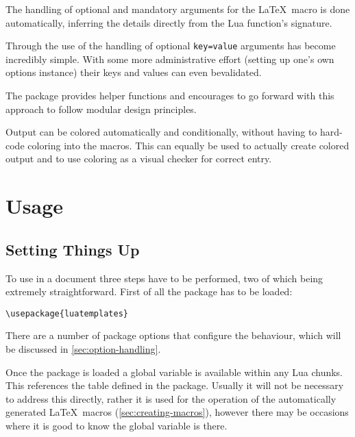 \documentclass{scrartcl}
\begin{document}
\begin{itemize*}
\item The handling of optional and mandatory arguments for the \LaTeX\ macro is
done automatically, inferring the details directly from the Lua function's signature.
\item Through the use of  the handling of optional
\texttt{key=value} arguments has become incredibly simple.  With some more
administrative effort (setting up one's own options instance) their keys and
values can even bevalidated.
\item The package provides helper functions and encourages to go forward with
this approach to follow modular design principles.
\item Output can be colored automatically and conditionally, without having to
hard-code coloring into the macros. This can equally be used to actually create
colored output and to use coloring as a visual checker for correct entry.
\end{itemize*}


\section{Usage}
\label{sec:usage}

\subsection{Setting Things Up}
\label{sec:setup}

To use  in a document three steps have to be performed,
two of which being extremely straightforward. First of all the package
has to be loaded:

\begin{verbatim}
\usepackage{luatemplates}
\end{verbatim}

\noindent There are a number of package options that configure the behaviour,
which will be discussed in \vref{sec:option-handling}.

Once the package is loaded a global variable  is
available within any Lua chunks.  This references the  table
defined in the package.  Usually it will not be necessary to address this
directly, rather it is used for the operation of the automatically generated
\LaTeX\ macros (\vref{sec:creating-macros}), however there may be occasions
where it is good to know the global variable is there.
\end{document}
